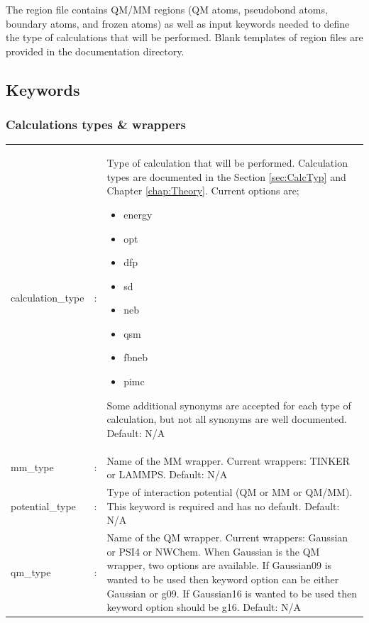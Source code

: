 \documentclass[12pt]{report}
\begin{document}
The region file contains QM/MM regions (QM atoms, pseudobond atoms, boundary
atoms, and frozen atoms) as well as input keywords needed to define the
type of calculations that will be performed.
Blank templates of region files are provided in the documentation
directory. \\

\subsection{Keywords}
\subsubsection{Calculations types \& wrappers}
\begin{center}
\begin{longtable}{ p{4cm} c p{12.5cm}}
calculation\_type & : & Type of calculation that will be performed.
Calculation types are documented in the Section \ref{sec:CalcTyp} and
Chapter \ref{chap:Theory}.
Current options are;\newline
\begin{itemize}
\item energy 
\item opt 
\item dfp 
\item sd 
\item neb 
\item qsm 
\item fbneb 
\item pimc\newline
\end{itemize}
Some additional synonyms are accepted for each type of calculation, but not
all synonyms are well documented.
Default: N/A \newline\\

mm\_type & : & Name of the MM wrapper.
Current wrappers: TINKER or LAMMPS.
Default: N/A \newline\\

potential\_type & : & Type of interaction potential (QM or MM or QM/MM).
This keyword is required and has no default.
Default: N/A \newline\\

qm\_type & : & Name of the QM wrapper.
Current wrappers: Gaussian or PSI4 or NWChem. 
When Gaussian is the QM wrapper, two options are available. 
If Gaussian09 is wanted to be used 
then keyword option can be either Gaussian or 
g09. 
If Gaussian16 is wanted to be used 
then keyword option should 
be g16. 
Default: N/A \\
\end{longtable}
\end{center}
\newpage
\end{document}

